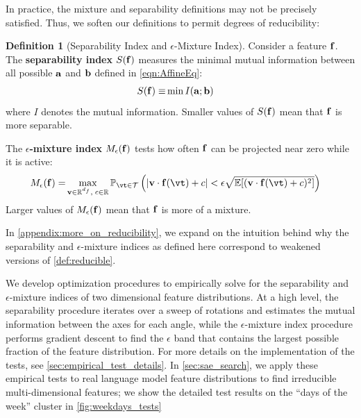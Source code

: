 \documentclass{article} %
\DeclareRobustCommand{\revOne}[1]{#1}
\theoremstyle{plain}
\theoremstyle{definition}
\newtheorem{definition}{Definition}
\begin{document}
In practice, the mixture and separability definitions may not be precisely satisfied.  Thus, we soften our definitions to permit degrees of reducibility:

\begin{definition}[Separability Index and $\epsilon$-Mixture Index]
    \label{def:in_practice_irreducibility}Consider a feature ${\mathbf f}$.  The \textbf{separability index} $S({\mathbf f})$ measures the minimal mutual information between all possible ${\mathbf a}$ and ${\mathbf b}$ defined in \cref{eqn:AffineEq}:
    \begin{align}
        S({\mathbf f}) \equiv& \min I({\mathbf a}; {\mathbf b}) \label{eqn:sep_index}
    \end{align}
    where $I$ denotes the mutual information. Smaller values of $S({\mathbf f})$ mean that ${\mathbf f}$ is more separable.

  

    The $\epsilon$\textbf{-mixture index} $M_\epsilon({\mathbf f})$ tests how often ${\mathbf f}$ can be projected near zero while it is active:
    \begin{align}
        M_\epsilon(\f) =& \max_{\justvv \in \mathbb{R}^{d_f},\; c \in \mathbb{R}} \mathbb{P}_{\vt \in \mathcal{T}}\left(|\justvv\cdot \f(\vt) + c| < \epsilon\sqrt{\mathbb{E}[(\justvv\cdot \f(\vt) + c)^2]}\right) \label{eqn:mixture_index}
    \end{align}
    Larger values of $M_\epsilon({\mathbf f})$ mean that ${\mathbf f}$ is more of a mixture.
\end{definition}

In \cref{appendix:more_on_reducibility}, we expand on the intuition behind why the separability and $\epsilon$-mixture indices as defined here correspond to weakened versions of \cref{def:reducible}. 

\revOne{We develop optimization procedures to empirically solve for the separability and $\epsilon$-mixture indices of two dimensional feature distributions. At a high level, the separability procedure iterates over a sweep of rotations and estimates the mutual information  between the axes for each angle, while the $\epsilon$-mixture index procedure performs gradient descent to find the $\epsilon$ band that contains the largest possible fraction of the feature distribution. For more details on the implementation of the tests, see \cref{sec:empirical_test_details}. In \cref{sec:sae_search}, we apply these empirical tests to real language model feature distributions to find irreducible multi-dimensional features; we show the detailed test results on the ``days of the week'' cluster in \cref{fig:weekdays_tests}
}
\end{document}
